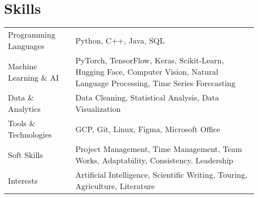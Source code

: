 \documentclass[a4paper,12pt]{article}
\begin{document}
\section{Skills}
\begin{tabularx}{\linewidth}{@{}l X@{}}
Programming Languages & \normalsize{Python, C++, Java, SQL}\\
Machine Learning \& AI & \normalsize{PyTorch, TensorFlow, Keras, Scikit-Learn, Hugging Face, Computer Vision, Natural Language Processing, Time Series Forecasting}\\
Data \& Analytics & \normalsize{Data Cleaning, Statistical Analysis, Data Visualization}\\
Tools \& Technologies & \normalsize{GCP, Git, Linux, Figma, Microsoft Office}\\
Soft Skills & \normalsize{Project Management, Time Management, Team Works, Adaptability, Consistency, Leadership}\\
Interests & \normalsize{Artificial Intelligence, Scientific Writing, Touring, Agriculture, Literature}\\
\end{tabularx}


\vfill
{}
\end{document}

